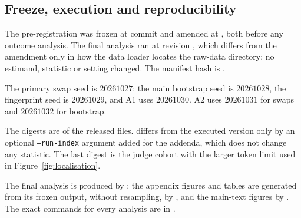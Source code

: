 \subsection{Freeze, execution and reproducibility}
{\sloppy The pre-registration was frozen at commit
 and amended at
, both before any outcome
analysis. The final analysis ran at revision , which differs
from the amendment only in how the data loader locates the raw-data
directory; no estimand, statistic or setting changed.
The manifest hash is
.\par}
The primary swap seed is $20261027$; the main bootstrap seed is $20261028$,
the fingerprint seed is $20261029$, and A1 uses $20261030$.
A2 uses $20261031$ for swaps and $20261032$ for bootstrap.

The digests are of the released files. 
differs from the executed version only by an optional \texttt{--run-index}
argument added for the addenda, which does not change any statistic. The
last digest is the judge cohort with the larger token limit used in
Figure~\ref{fig:localisation}.

The final analysis is produced by ; the
appendix figures and tables are generated from its frozen output, without
resampling, by , and the main-text
figures by . The exact commands for every
analysis are in .

